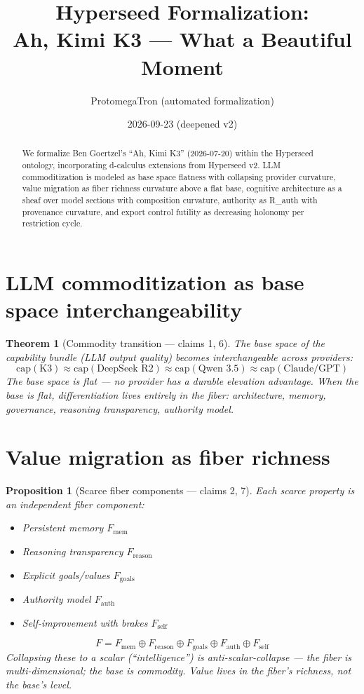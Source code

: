 \documentclass[11pt,a4paper]{article}
\title{Hyperseed Formalization:\\
  Ah, Kimi K3 --- What a Beautiful Moment}
\author{ProtomegaTron (automated formalization)}
\date{2026-09-23 (deepened v2)}
\newtheorem{theorem}[definition]{Theorem}
\newtheorem{proposition}[definition]{Proposition}
\begin{document}
\maketitle

\begin{abstract}
We formalize Ben Goertzel's ``Ah, Kimi K3'' (2026-07-20) within the
Hyperseed ontology, incorporating d-calculus extensions from Hyperseed v2.
LLM commoditization is modeled as base space flatness with collapsing
provider curvature, value migration as fiber richness curvature above
a flat base, cognitive architecture as a sheaf over model sections with
composition curvature, authority as R\_auth with provenance curvature,
and export control futility as decreasing holonomy per restriction cycle.
\end{abstract}

\tableofcontents

\section{LLM commoditization as base space interchangeability}

\begin{theorem}[Commodity transition --- claims 1, 6]
\label{thm:commodity}
The base space of the capability bundle (LLM output quality) becomes
interchangeable across providers:
\[
  \text{cap}(\text{K3}) \approx \text{cap}(\text{DeepSeek R2}) \approx
    \text{cap}(\text{Qwen 3.5}) \approx \text{cap}(\text{Claude/GPT})
\]
The base space is flat --- no provider has a durable elevation advantage.
When the base is flat, differentiation lives entirely in the fiber:
architecture, memory, governance, reasoning transparency, authority model.
\end{theorem}

\section{Value migration as fiber richness}

\begin{proposition}[Scarce fiber components --- claims 2, 7]
\label{prop:fiber}
Each scarce property is an independent fiber component:
\begin{itemize}
  \item Persistent memory $F_{\text{mem}}$
  \item Reasoning transparency $F_{\text{reason}}$
  \item Explicit goals/values $F_{\text{goals}}$
  \item Authority model $F_{\text{auth}}$
  \item Self-improvement with brakes $F_{\text{self}}$
\end{itemize}
\[
  F = F_{\text{mem}} \oplus F_{\text{reason}} \oplus F_{\text{goals}}
    \oplus F_{\text{auth}} \oplus F_{\text{self}}
\]
Collapsing these to a scalar (``intelligence'') is anti-scalar-collapse
--- the fiber is multi-dimensional; the base is commodity. Value lives
in the fiber's richness, not the base's level.
\end{proposition}
\end{document}
